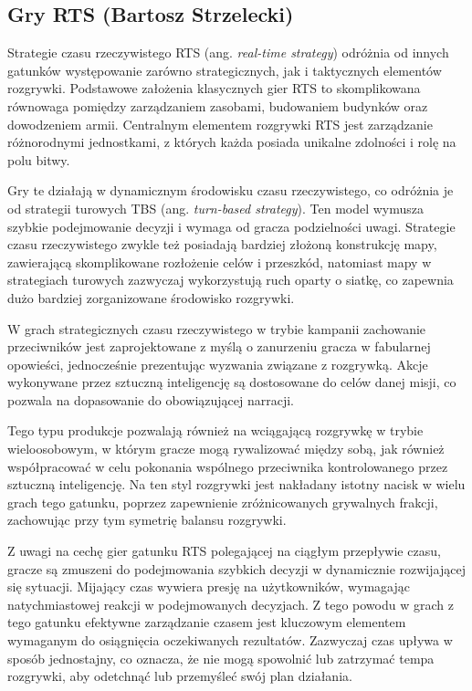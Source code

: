\subsection{Gry RTS (Bartosz Strzelecki)}\label{ss:rts}
Strategie czasu rzeczywistego RTS (ang. \textit{real-time strategy}) odróżnia od innych gatunków występowanie zarówno strategicznych, jak i taktycznych
elementów rozgrywki. Podstawowe założenia klasycznych gier RTS to skomplikowana równowaga pomiędzy zarządzaniem zasobami, budowaniem budynków oraz
dowodzeniem armii. Centralnym elementem rozgrywki RTS jest zarządzanie różnorodnymi jednostkami, z których każda posiada unikalne zdolności i rolę na polu bitwy.

Gry te działają w dynamicznym środowisku czasu rzeczywistego, co odróżnia je od strategii turowych TBS (ang. \textit{turn-based strategy}). Ten model wymusza szybkie podejmowanie decyzji
i wymaga od gracza podzielności uwagi. Strategie czasu rzeczywistego zwykle też posiadają bardziej złożoną konstrukcję mapy, zawierającą skomplikowane
rozłożenie celów i przeszkód, natomiast mapy w strategiach turowych zazwyczaj wykorzystują ruch oparty o siatkę, co zapewnia dużo bardziej
zorganizowane środowisko rozgrywki.

W grach strategicznych czasu rzeczywistego w trybie kampanii zachowanie przeciwników jest zaprojektowane z myślą o zanurzeniu gracza w fabularnej opowieści, jednocześnie
prezentując wyzwania związane z rozgrywką. Akcje wykonywane przez sztuczną inteligencję są dostosowane do celów danej misji, co pozwala
na dopasowanie do obowiązującej narracji.

Tego typu produkcje pozwalają również na wciągającą rozgrywkę w trybie wieloosobowym, w którym gracze mogą rywalizować między sobą, jak również
współpracować w celu pokonania wspólnego przeciwnika kontrolowanego przez sztuczną inteligencję. Na ten styl rozgrywki jest nakładany istotny nacisk
w wielu grach tego gatunku, poprzez zapewnienie zróżnicowanych grywalnych frakcji, zachowując przy tym symetrię balansu rozgrywki.

Z uwagi na cechę gier gatunku RTS polegającej na ciągłym przepływie czasu, gracze są zmuszeni
do podejmowania szybkich decyzji w dynamicznie rozwijającej się sytuacji. Mijający czas
wywiera presję na użytkowników, wymagając natychmiastowej reakcji w podejmowanych decyzjach.
Z tego powodu w grach z tego gatunku efektywne zarządzanie czasem jest kluczowym elementem
wymaganym do osiągnięcia oczekiwanych rezultatów. Zazwyczaj czas upływa w sposób jednostajny, co oznacza, że
nie mogą spowolnić lub zatrzymać tempa rozgrywki, aby odetchnąć lub przemyśleć swój plan działania.

